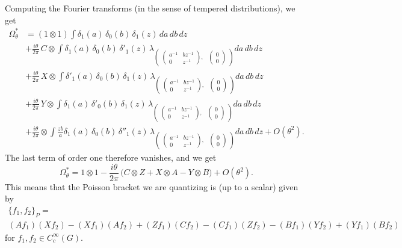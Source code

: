 \documentclass[a4paper,11pt,reqno]{amsart}
\numberwithin{equation}{section}
\theoremstyle{remark}
\theoremstyle{definition}
\begin{document}
Computing the Fourier transforms  (in the sense of tempered distributions), we get
\begin{align*}
\Omega^*_\theta&=(1\otimes 1)\int\delta_1(a)\,\delta_0(b)\,\delta_1(z)\, da\,db\,dz\\
&+ \frac{i\theta}{2\pi}\, C\otimes\int \delta_1(a)\,\delta_0(b)\,\delta'_1(z)\,\lambda_{\begin{pmatrix} \begin{pmatrix}a^{-1}&bz^{-1}\\0&z^{-1}\end{pmatrix},
&\!\!\!\!\begin{pmatrix}0\\0\end{pmatrix}\end{pmatrix}}
 da\,db\,dz\\
&+  \frac{i\theta}{2\pi}\, X\otimes\int\delta'_1(a)\,\delta_0(b)\,\delta_1(z)\,\lambda_{\begin{pmatrix} \begin{pmatrix}a^{-1}&bz^{-1}\\0&z^{-1}\end{pmatrix},
&\!\!\!\!\begin{pmatrix}0\\0\end{pmatrix}\end{pmatrix}}
 da\,db\,dz\\
&+  \frac{i\theta}{2\pi}\, Y\otimes\int\delta_1(a)\,\delta'_0(b)\,\delta_1(z)\,\lambda_{\begin{pmatrix} \begin{pmatrix}a^{-1}&bz^{-1}\\0&z^{-1}
\end{pmatrix},&\!\!\!\!\begin{pmatrix}0\\0\end{pmatrix}\end{pmatrix}} da\,db\,dz\\
&+\frac{i \theta}{2\pi}\otimes\int \frac{zb}a \delta_1(a)\,\delta_0(b)\,\delta''_1(z)\,
\lambda_{\begin{pmatrix} \begin{pmatrix}a^{-1}&bz^{-1}\\0&z^{-1}\end{pmatrix},&\!\!\!\!\begin{pmatrix}0\\0\end{pmatrix}\end{pmatrix}}
 da\,db\,dz + O(\theta^2).
\end{align*}
The last  term of order one therefore vanishes, and we get
\begin{equation}
\label{SCL}
\Omega^*_\theta=1\otimes 1
-\frac{i\theta}{2\pi}\, \big(C\otimes Z + X\otimes A- Y\otimes B\big)+ O(\theta^2).
\end{equation}
This means that the Poisson bracket we are quantizing is (up to a scalar) given  by
\begin{multline*}
\{f_1,f_2\}_{P}= \\
(Af_1)(Xf_2) -(Xf_1)(Af_2)+(Zf_1)(Cf_2)-(Cf_1) (Zf_2)-(Bf_1)(Yf_2) +(Yf_1)(Bf_2)
\end{multline*}
for $f_1,f_2\in C^\infty_c(G)$.
\end{document}
